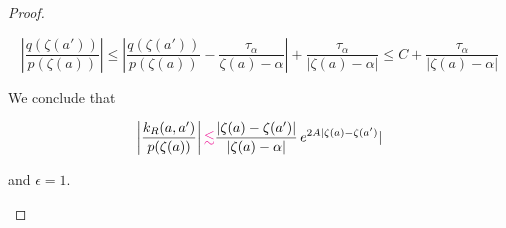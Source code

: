 \documentclass{article}
\theoremstyle{plain}
\newcommand{\volterra}{\mathcal{V}}
\newcommand{\hardpart}{\mathcal{V}_\text{basic}}
\newcommand{\softpart}{\mathcal{V}_\text{extra}}
\begin{document}
\begin{proof}
\begin{enumerate}
\[    \left\vert \frac{q(\zeta(a'))}{p(\zeta(a))}\right\vert  \leq \left\vert \frac{q(\zeta(a'))}{p(\zeta(a))} -\frac{\tau_\alpha}{\zeta(a)-\alpha}\right\vert + \frac{\tau_\alpha}{|\zeta(a)-\alpha|}\leq C +  \frac{\tau_\alpha}{|\zeta(a)-\alpha|} \]

We conclude that 

\[\left\vert \frac{k_R(a,a')}{p(\zeta(a))}\right\vert\textcolor{magenta}{\lesssim} \frac{|\zeta(a)-\zeta(a')|}{|\zeta(a)-\alpha|}\, e^{2A |\zeta(a)-\zeta(a')} | \]

and $\epsilon=1$.

\end{enumerate}



\end{proof}





\end{document}
